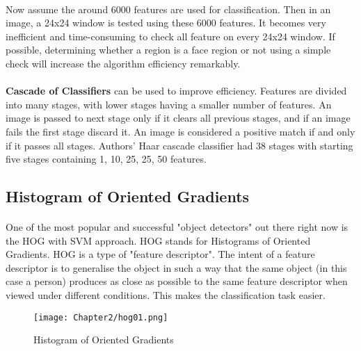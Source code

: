 	\paragraph{}Now assume the around 6000 features are used for classification. Then in an image, a 24x24 window is tested using these 6000 features. It becomes very inefficient and time-consuming to check all feature on every 24x24 window. If possible, determining whether a region is a face region or not using a simple check will increase the algorithm efficiency remarkably.
	
	\paragraph{}\textbf{Cascade of Classifiers} can be used to improve efficiency. Features are divided into many stages, with lower stages having a smaller number of features. An image is passed to next stage only if it clears all previous stages, and if an image fails the first stage discard it. An image is considered a positive match if and only if it passes all stages. Authors' Haar cascade classifier had 38 stages with starting five stages containing 1, 10, 25, 25, 50 features.
	
	
	\subsection{Histogram of Oriented Gradients}
	
	\paragraph{}One of the most popular and successful "object detectors" out there right now is the HOG with SVM approach. HOG stands for Histograms of Oriented Gradients. HOG is a type of "feature descriptor". The intent of a feature descriptor is to generalise the object in such a way that the same object (in this case a person) produces as close as possible to the same feature descriptor when viewed under different conditions. This makes the classification task easier.
	
	\begin{figure}[h]
		\begin{center}
			\texttt{[image: Chapter2/hog01.png]}
			\caption{Histogram of Oriented Gradients}
			\label{fig:hog}
		\end{center}
	\end{figure}
	
